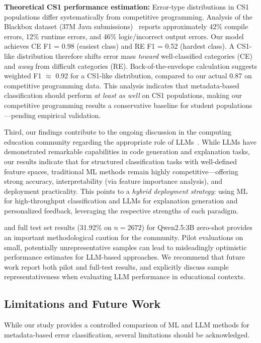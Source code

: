\documentclass[acmsmall]{acmart}
\begin{document}
\textbf{Theoretical CS1 performance estimation:} Error-type distributions in CS1
populations differ systematically from competitive programming. Analysis of the
Blackbox dataset (37M Java submissions)~\cite{altadmri2015most} reports approximately
42\% compile errors, 12\% runtime errors, and 46\% logic/incorrect output errors.
Our model achieves CE F1 = 0.98 (easiest class) and RE F1 = 0.52 (hardest class).
A CS1-like distribution therefore shifts error mass \emph{toward} well-classified
categories (CE) and \emph{away} from difficult categories (RE). Back-of-the-envelope
calculation suggests weighted F1 $\approx$ 0.92 for a CS1-like distribution, compared
to our actual 0.87 on competitive programming data. This analysis indicates that
metadata-based classification should perform \emph{at least as well} on CS1 populations,
making our competitive programming results a conservative baseline for student
populations---pending empirical validation.

Third, our findings contribute to the ongoing discussion in the computing
education community regarding the appropriate role of
LLMs~\cite{finnie2022robots,kazemitabaar2024impact}. While LLMs have
demonstrated remarkable capabilities in code generation and explanation tasks,
our results indicate that for structured classification tasks with
well-defined feature spaces, traditional ML methods remain highly
competitive---offering strong accuracy, interpretability (via feature
importance analysis), and deployment practicality. This points to a
\textit{hybrid deployment strategy}: using ML for high-throughput
classification and LLMs for explanation generation and personalized
feedback, leveraging the respective strengths of each paradigm.

and full test set results (31.92\% on $n=2{}672$) for Qwen2.5:3B zero-shot
provides an important methodological caution for the community.
Pilot evaluations on small, potentially unrepresentative samples can
lead to misleadingly optimistic performance estimates for LLM-based
approaches. We recommend that future work report both pilot and full-test
results, and explicitly discuss sample representativeness when evaluating
LLM performance in educational contexts.

\subsection{Limitations and Future Work}

While our study provides a controlled comparison of ML and LLM methods
for metadata-based error classification, several limitations should be
acknowledged.
\end{document}
